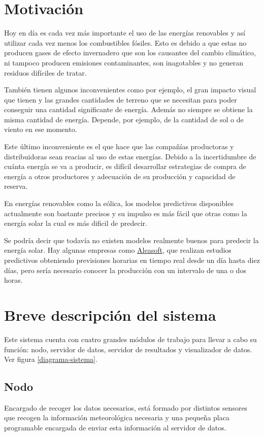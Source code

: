 \section{Motivación}
\label{makereference1.1}

Hoy en día es cada vez más importante el uso de las energías renovables y así utilizar cada vez menos los combustibles fósiles. Esto es debido a que estas no producen gases de efecto invernadero que son los causantes del cambio climático, ni tampoco producen emisiones contaminantes, son inagotables y no generan residuos difíciles de tratar.

También tienen algunos inconvenientes como por ejemplo, el gran impacto visual que tienen y las grandes cantidades de terreno que se necesitan para poder conseguir una cantidad significante de energía. Además no siempre se obtiene la misma cantidad de energía. Depende, por ejemplo, de la cantidad de sol o de viento en ese momento.

Este último inconveniente es el que hace que las compañías productoras y distribuidoras sean reacias al uso de estas energías. Debido a la incertidumbre de cuánta energía se va a producir, es difícil desarrollar estrategias de compra de energía a otros productores y adecuación de su producción y capacidad de reserva.

En energías renovables como la eólica, los modelos predictivos disponibles actualmente son bastante precisos y su impulso es más fácil que otras como la energía solar la cual es más dificil de predecir.

Se podría decir que todavía no existen modelos realmente buenos para predecir la energía solar. Hay algunas empresas como \href{https://aleasoft.com/es/}{Aleasoft}, que realizan estudios predictivos obteniendo previsiones horarias en tiempo real desde un día hasta diez días, pero sería necesario conocer la producción con un intervalo de una o dos horas.

\section{Breve descripción del sistema}
\label{makereference1.2}

Este sistema cuenta con cuatro grandes módulos de trabajo para llevar a cabo su función: nodo, servidor de datos, servidor de resultados y visualizador de datos. Ver figura \ref{diagrama-sistema}.

\subsection{Nodo}
\label{makereference1.2.1}
Encargado de recoger los datos necesarios, está formado por distintos sensores que recogen la información meteorológica necesaria y una pequeña placa programable encargada de enviar esta información al servidor de datos.

